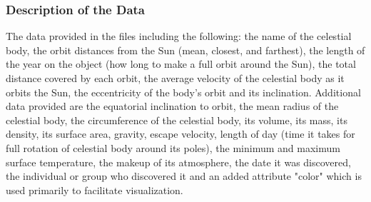 \documentclass[journal]{vgtc}                %
\begin{document}
\subsubsection{Description of the Data}
The data provided in the files including the following: the name of the celestial body, the orbit distances from the Sun (mean, closest, and farthest), the length of the year on the object (how long to make a full orbit around the Sun), the total distance covered by each orbit, the average velocity of the celestial body as it orbits the Sun, the eccentricity of the body's orbit and its inclination. Additional data provided are the equatorial inclination to orbit, the mean radius of the celestial body, the circumference of the celestial body, its volume, its mass, its density, its surface area, gravity, escape velocity, length of day (time it takes for full rotation of celestial body around its poles), the minimum and maximum surface temperature, the makeup of its atmosphere, the date it was discovered, the individual or group who discovered it and an added attribute "color" which is used primarily to facilitate visualization. 


\end{document}
